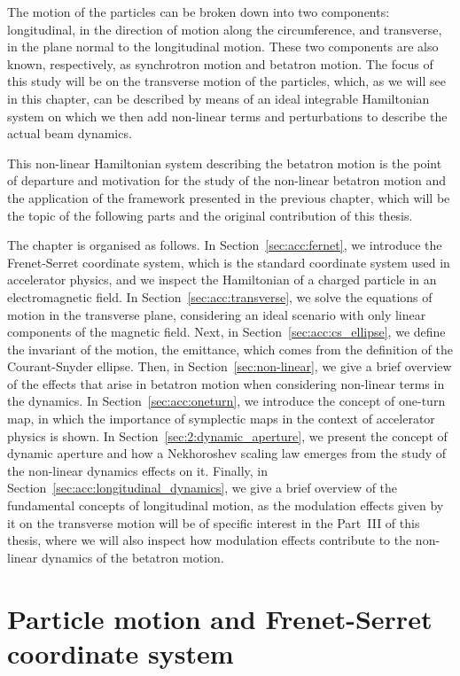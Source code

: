 The motion of the particles can be broken down into two components: longitudinal, in the direction of motion along the circumference, and transverse, in the plane normal to the longitudinal motion. These two components are also known, respectively, as synchrotron motion and betatron motion.
The focus of this study will be on the transverse motion of the particles, which, as we will see in this chapter, can be described by means of an ideal integrable Hamiltonian system on which we then add non-linear terms and perturbations to describe the actual beam dynamics.

This non-linear Hamiltonian system describing the betatron motion is the point of departure and motivation for the study of the non-linear betatron motion and the application of the framework presented in the previous chapter, which will be the topic of the following parts and the original contribution of this thesis.

The chapter is organised as follows. In Section~\ref{sec:acc:fernet}, we introduce the Frenet-Serret coordinate system, which is the standard coordinate system used in accelerator physics, and we inspect the Hamiltonian of a charged particle in an electromagnetic field. In Section~\ref{sec:acc:transverse}, we solve the equations of motion in the transverse plane, considering an ideal scenario with only linear components of the magnetic field. Next, in Section~\ref{sec:acc:cs_ellipse}, we define the invariant of the motion, the emittance, which comes from the definition of the Courant-Snyder ellipse. Then, in Section~\ref{sec:non-linear}, we give a brief overview of the effects that arise in betatron motion when considering non-linear terms in the dynamics. In Section~\ref{sec:acc:oneturn}, we introduce the concept of one-turn map, in which the importance of symplectic maps in the context of accelerator physics is shown. In Section~\ref{sec:2:dynamic_aperture}, we present the concept of dynamic aperture and how a Nekhoroshev scaling law emerges from the study of the non-linear dynamics effects on it. Finally, in Section~\ref{sec:acc:longitudinal_dynamics}, we give a brief overview of the fundamental concepts of longitudinal motion, as the modulation effects given by it on the transverse motion will be of specific interest in the Part~III of this thesis, where we will also inspect how modulation effects contribute to the non-linear dynamics of the betatron motion. 


\section{Particle motion and Frenet-Serret coordinate system~\label{sec:acc:fernet}}

